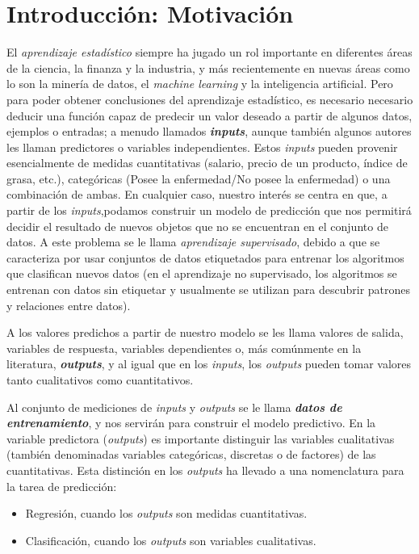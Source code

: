 \documentclass[letterpaper,12pt,oneside]{book}
\begin{document}
	\section{Introducción: Motivación}
{El \textit{aprendizaje estadístico} siempre ha jugado un rol importante en diferentes áreas de la ciencia, la finanza y la industria, y más recientemente en nuevas áreas como lo son la minería de datos, el \textit{machine learning} y la inteligencia artificial. Pero para poder obtener conclusiones del aprendizaje estadístico, es necesario necesario deducir una función capaz de predecir un valor deseado a partir de algunos datos, ejemplos o entradas; a menudo llamados \textbf{\textit{inputs}}, aunque también algunos autores les llaman predictores o variables independientes. Estos \textit{inputs} pueden provenir esencialmente de medidas cuantitativas (salario, precio de un producto, índice de grasa, etc.), categóricas (Posee la enfermedad/No posee la enfermedad) o una combinación de ambas. En cualquier caso, nuestro interés se centra en que, a partir de los \textit{inputs},podamos construir un modelo de predicción que nos permitirá decidir el resultado de nuevos objetos que no se encuentran en el conjunto de datos. A este problema se le llama \textit{aprendizaje supervisado}, debido a que se caracteriza por usar conjuntos de datos etiquetados para entrenar los algoritmos que clasifican nuevos datos (en el aprendizaje no supervisado, los algoritmos se entrenan con datos sin etiquetar y usualmente se utilizan para descubrir patrones y relaciones entre datos).

A los valores predichos a partir de nuestro modelo se les llama valores de salida, variables de respuesta, variables dependientes o, más comúnmente en la literatura, \textit{\textbf{outputs}}, y al igual que en los \textit{inputs}, los \textit{outputs} pueden tomar valores tanto cualitativos como cuantitativos.

Al conjunto de mediciones de \textit{inputs} y \textit{outputs} se le llama \textbf{\textit{datos de entrenamiento}}, y nos servirán para construir el modelo predictivo. En la variable predictora (\textit{outputs}) es importante distinguir las variables cualitativas (también denominadas variables categóricas, discretas o de factores) de las cuantitativas. Esta distinción en los \textit{outputs} ha llevado a una nomenclatura para la tarea de predicción:

\begin{itemize}
    \item Regresión, cuando los \textit{outputs} son medidas cuantitativas.
    \item Clasificación, cuando los \textit{outputs} son variables cualitativas.
\end{itemize}

}
\end{document}
